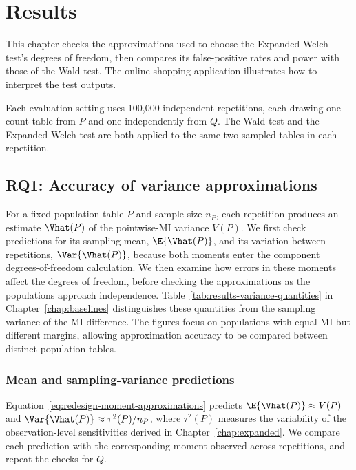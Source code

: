 \chapter{Results}
\label{chap:results}


This chapter checks the approximations used to choose the Expanded Welch test's
degrees of freedom, then compares its false-positive rates and power with
those of the Wald test. The online-shopping application illustrates how to interpret
the test outputs.

Each evaluation setting uses 100,000 independent repetitions, each drawing
one count table from \(P\) and one independently from \(Q\). The Wald test and the Expanded Welch test are both applied to the same two sampled tables in
each repetition.

\section{RQ1: Accuracy of variance approximations}

For a fixed population table \(P\) and sample size \(n_P\), each
repetition produces an estimate \(\Vhat(P)\) of the pointwise-MI variance
\(V(P)\). We first check predictions for its sampling mean,
\(\E\{\Vhat(P)\}\), and its variation between repetitions,
\(\Var\{\Vhat(P)\}\), because both moments enter the component
degrees-of-freedom calculation. We then examine how errors in these
moments affect the degrees of freedom, before checking the approximations
as the populations approach independence.
Table~\ref{tab:results-variance-quantities} in
Chapter~\ref{chap:baselines} distinguishes these quantities from the
sampling variance of the MI difference.
The figures focus on populations with equal MI but different margins,
allowing approximation accuracy to be compared between distinct population
tables.

\subsection{Mean and sampling-variance predictions}

Equation~\eqref{eq:redesign-moment-approximations} predicts
\(\E\{\Vhat(P)\}\approx V(P)\) and
\(\Var\{\Vhat(P)\}\approx\tau^2(P)/n_P\), where \(\tau^2(P)\)
measures the variability of the observation-level sensitivities derived
in Chapter~\ref{chap:expanded}. We compare each prediction with the
corresponding moment observed across repetitions, and repeat the checks
for \(Q\).

